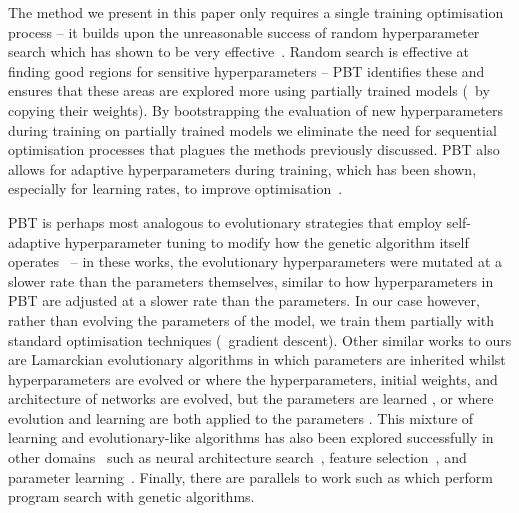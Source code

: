 The method we present in this paper only requires a single training optimisation process -- it builds upon the unreasonable success of random hyperparameter search which has shown to be very effective~\citep{bergstra2012random}. Random search is effective at finding good regions for sensitive hyperparameters -- PBT identifies these and ensures that these areas are explored more using partially trained models (\eg~by copying their weights). By bootstrapping the evaluation of new hyperparameters during training on partially trained models we eliminate the need for sequential optimisation processes that plagues the methods previously discussed. PBT also allows for adaptive hyperparameters during training, which has been shown, especially for learning rates, to improve optimisation~\citep{loshchilov2016sgdr,smith2017cyclical,masse2015speed}. 

PBT is perhaps most analogous to evolutionary strategies that employ self-adaptive hyperparameter tuning to modify how the genetic algorithm itself operates~\citep{back1998overview,Spears95adaptingcrossover,gloger2004self,clune2008natural} -- in these works, the evolutionary hyperparameters were mutated at a slower rate than the parameters themselves, similar to how hyperparameters in PBT are adjusted at a slower rate than the parameters. In our case however, rather than evolving the parameters of the model, we train them partially with standard optimisation techniques (\eg~gradient descent). Other similar works to ours are Lamarckian evolutionary algorithms in which parameters are inherited whilst hyperparameters are evolved \citep{castillo2006lamarckian} or where the hyperparameters, initial weights, and architecture of networks are evolved, but the parameters are learned \citep{castillo1999g,husken2000optimization}, or where evolution and learning are both applied to the parameters \citep{ku1997exploring,houck1997empirical,igel2005evolutionary}. This mixture of learning and evolutionary-like algorithms has also been explored successfully in other domains~\citep{zhang2011evolutionary} such as neural architecture search~\citep{real2017large,liu2017hierarchical}, feature selection~\citep{xue2016survey}, and parameter learning~\citep{fernando2016convolution}. Finally, there are parallels to work such as \cite{salustowicz1997probabilistic} which perform program search with genetic algorithms.
